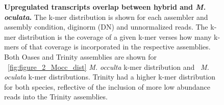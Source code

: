 \begin{figure}[!ht]
	\caption{\textbf{Upregulated transcripts overlap between hybrid and \textit{M. oculata}.} The k-mer distribution is shown for each assembler and assembly condition, diginorm (DN) and unnormalized reads. The k-mer distribution is the coverage of a given k-mer verses how many k-mers of that coverage is incorporated in the respective assemblies. Both Oases and Trinity assemblies are shown for ~\ref{fig:figure_2_Mocc_dist} \textit{M. occulta} k-mer distribution and  ~\textit{M. oculata} k-mer distributions. Trinity had a higher k-mer distribution for both species, reflective of the inclusion of more low abundance reads into the Trinity assemblies.}	
	\label{fig:upreg_tb}
\end{figure}

